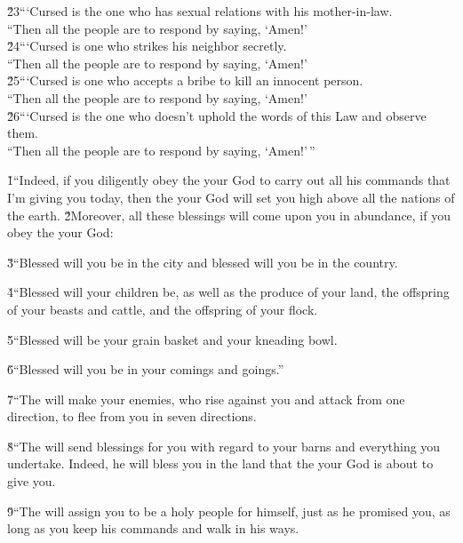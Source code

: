 \begin{poetry}
\poeml \v{23}```Cursed is the one who has sexual relations with his mother-in-law. \\
\poeml ``Then all the people are to respond by saying, `Amen!' \\
\poeml \v{24}```Cursed is one who strikes his neighbor secretly. \\
\poeml ``Then all the people are to respond by saying, `Amen!' \\
\poeml \v{25}```Cursed is one who accepts a bribe to kill an innocent person. \\
\poeml ``Then all the people are to respond by saying, `Amen!' \\
\poeml \v{26}```Cursed is the one who doesn't uphold the words of this Law and observe them. \\
\poeml ``Then all the people are to respond by saying, `Amen!'\,''
\end{poetry}

\v{1}``Indeed, if you diligently obey the  your God to carry out all his commands that I'm giving you today, then the  your God will set you high above all the nations of the earth. \v{2}Moreover, all these blessings will come upon you in abundance, if you obey the  your God:

\v{3}``Blessed will you be in the city and blessed will you be in the country.

\v{4}``Blessed will your children be, as well as the produce of your land, the offspring of your beasts and cattle, and the offspring of your flock.

\v{5}``Blessed will be your grain basket and your kneading bowl.

\v{6}``Blessed will you be in your comings and goings.''

\v{7}``The  will make your enemies, who rise against you and attack from one direction, to flee from you in seven directions.

\v{8}``The  will send blessings for you with regard to your barns and everything you undertake. Indeed, he will bless you in the land that the  your God is about to give you.

\v{9}``The  will assign you to be a holy people for himself, just as he promised you, as long as you keep his commands and walk in his ways.

